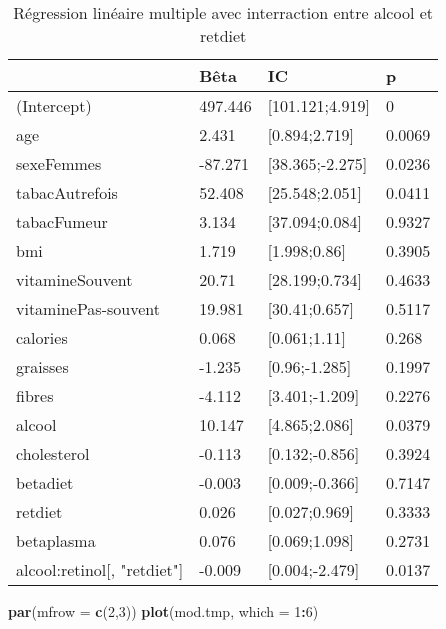 \documentclass[]{article}
\newenvironment{Shaded}{\begin{snugshade}}{\end{snugshade}}
\newcommand{\KeywordTok}[1]{\textcolor[rgb]{0.13,0.29,0.53}{\textbf{#1}}}
\newcommand{\DataTypeTok}[1]{\textcolor[rgb]{0.13,0.29,0.53}{#1}}
\newcommand{\DecValTok}[1]{\textcolor[rgb]{0.00,0.00,0.81}{#1}}
\newcommand{\OperatorTok}[1]{\textcolor[rgb]{0.81,0.36,0.00}{\textbf{#1}}}
\newcommand{\NormalTok}[1]{#1}
\begin{document}
\begin{table}

\caption{\label{tab:unnamed-chunk-77}Régression linéaire multiple avec interraction entre alcool et retdiet}
\centering
\begin{tabular}[t]{l|l|l|l}
\hline
  & Bêta & IC & p\\
\hline
\rowcolor[HTML]{BBD2E1}  (Intercept) & 497.446 & [101.121;4.919] & 0\\
\hline
age & 2.431 & [0.894;2.719] & 0.0069\\
\hline
\rowcolor[HTML]{BBD2E1}  sexeFemmes & -87.271 & [38.365;-2.275] & 0.0236\\
\hline
tabacAutrefois & 52.408 & [25.548;2.051] & 0.0411\\
\hline
\rowcolor[HTML]{BBD2E1}  tabacFumeur & 3.134 & [37.094;0.084] & 0.9327\\
\hline
bmi & 1.719 & [1.998;0.86] & 0.3905\\
\hline
\rowcolor[HTML]{BBD2E1}  vitamineSouvent & 20.71 & [28.199;0.734] & 0.4633\\
\hline
vitaminePas-souvent & 19.981 & [30.41;0.657] & 0.5117\\
\hline
\rowcolor[HTML]{BBD2E1}  calories & 0.068 & [0.061;1.11] & 0.268\\
\hline
graisses & -1.235 & [0.96;-1.285] & 0.1997\\
\hline
\rowcolor[HTML]{BBD2E1}  fibres & -4.112 & [3.401;-1.209] & 0.2276\\
\hline
alcool & 10.147 & [4.865;2.086] & 0.0379\\
\hline
\rowcolor[HTML]{BBD2E1}  cholesterol & -0.113 & [0.132;-0.856] & 0.3924\\
\hline
betadiet & -0.003 & [0.009;-0.366] & 0.7147\\
\hline
\rowcolor[HTML]{BBD2E1}  retdiet & 0.026 & [0.027;0.969] & 0.3333\\
\hline
betaplasma & 0.076 & [0.069;1.098] & 0.2731\\
\hline
\rowcolor[HTML]{BBD2E1}  alcool:retinol[, "retdiet"] & -0.009 & [0.004;-2.479] & 0.0137\\
\hline
\end{tabular}
\end{table}

\begin{Shaded}
\begin{Highlighting}[]
\KeywordTok{par}\NormalTok{(}\DataTypeTok{mfrow =} \KeywordTok{c}\NormalTok{(}\DecValTok{2}\NormalTok{,}\DecValTok{3}\NormalTok{))}
\KeywordTok{plot}\NormalTok{(mod.tmp, }\DataTypeTok{which =} \DecValTok{1}\OperatorTok{:}\DecValTok{6}\NormalTok{)}
\end{Highlighting}
\end{Shaded}
\end{document}

